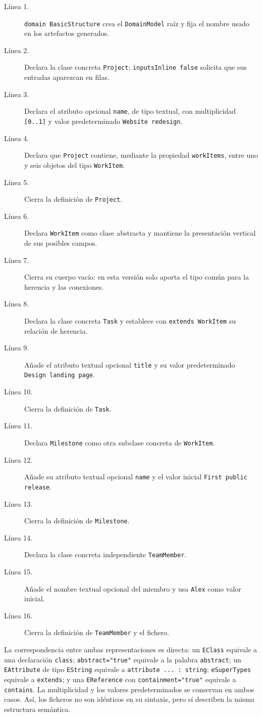\begin{description}
  \item[Línea 1.] \texttt{domain BasicStructure} crea el
  \texttt{DomainModel} raíz y fija el nombre usado en los artefactos generados.
  \item[Línea 2.] Declara la clase concreta \texttt{Project};
  \texttt{inputsInline false} solicita que sus entradas aparezcan en filas.
  \item[Línea 3.] Declara el atributo opcional \texttt{name}, de tipo textual,
  con multiplicidad \texttt{[0..1]} y valor predeterminado
  \texttt{Website redesign}.
  \item[Línea 4.] Declara que \texttt{Project} contiene, mediante la propiedad
  \texttt{workItems}, entre uno y seis objetos del tipo \texttt{WorkItem}.
  \item[Línea 5.] Cierra la definición de \texttt{Project}.
  \item[Línea 6.] Declara \texttt{WorkItem} como clase abstracta y mantiene la
  presentación vertical de sus posibles campos.
  \item[Línea 7.] Cierra su cuerpo vacío: en esta versión solo aporta el tipo
  común para la herencia y las conexiones.
  \item[Línea 8.] Declara la clase concreta \texttt{Task} y establece con
  \texttt{extends WorkItem} su relación de herencia.
  \item[Línea 9.] Añade el atributo textual opcional \texttt{title} y su valor
  predeterminado \texttt{Design landing page}.
  \item[Línea 10.] Cierra la definición de \texttt{Task}.
  \item[Línea 11.] Declara \texttt{Milestone} como otra subclase concreta de
  \texttt{WorkItem}.
  \item[Línea 12.] Añade su atributo textual opcional \texttt{name} y el valor
  inicial \texttt{First public release}.
  \item[Línea 13.] Cierra la definición de \texttt{Milestone}.
  \item[Línea 14.] Declara la clase concreta independiente
  \texttt{TeamMember}.
  \item[Línea 15.] Añade el nombre textual opcional del miembro y usa
  \texttt{Alex} como valor inicial.
  \item[Línea 16.] Cierra la definición de \texttt{TeamMember} y el fichero.
\end{description}

La correspondencia entre ambas representaciones es directa: un
\texttt{EClass} equivale a una declaración \texttt{class};
\texttt{abstract="true"} equivale a la palabra \texttt{abstract}; un
\texttt{EAttribute} de tipo \texttt{EString} equivale a
\texttt{attribute ... : string}; \texttt{eSuperTypes} equivale a
\texttt{extends}; y una \texttt{EReference} con
\texttt{containment="true"} equivale a \texttt{contains}. La multiplicidad y
los valores predeterminados se conservan en ambos casos. Así, los ficheros no
son idénticos en su sintaxis, pero sí describen la misma estructura semántica.

